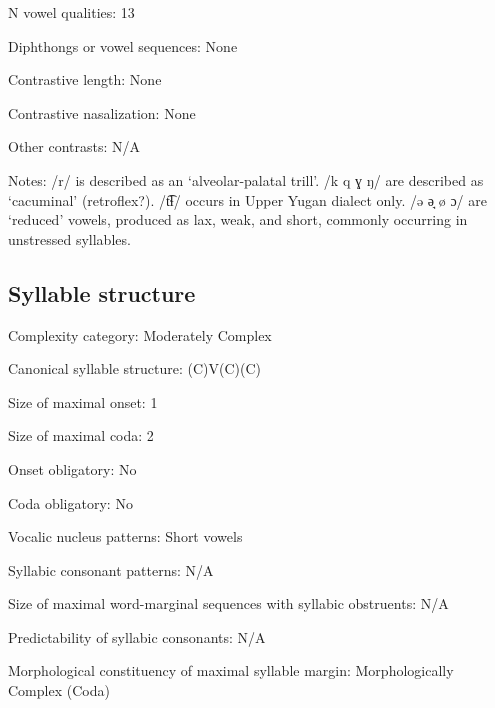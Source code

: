 {\begin{appendixdesc}
\item[N vowel qualities:] 13

\item[Diphthongs or vowel sequences:] None

\item[Contrastive length:] None

\item[Contrastive nasalization:] None

\item[Other contrasts:] N/A

\item[Notes:] /r/ is described as an ‘alveolar-palatal trill’. /k q ɣ ŋ/ are described as ‘cacuminal’ (retroflex?). /t͡ɬ/ occurs in Upper Yugan dialect only. /ə ə̘ ø ɔ/ are ‘reduced’ vowels, produced as lax, weak, and short, commonly occurring in unstressed syllables.
\end{appendixdesc}
\subsection*{Syllable structure}
\begin{appendixdesc}

\item[Complexity category:] Moderately Complex

\item[Canonical syllable structure:] (C)V(C)(C) \citep[53--57]{Filchenko2007}

\item[Size of maximal onset:] 1

\item[Size of maximal coda:] 2

\item[Onset obligatory:] No

\item[Coda obligatory:] No

\item[Vocalic nucleus patterns:] Short vowels

\item[Syllabic consonant patterns:] N/A

\item[Size of maximal word-marginal sequences with syllabic obstruents:] N/A

\item[Predictability of syllabic consonants:] N/A

\item[Morphological constituency of maximal syllable margin:] Morphologically Complex (Coda)


\end{appendixdesc}}
